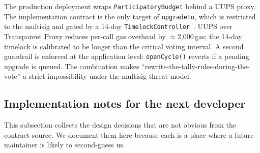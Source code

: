 \documentclass[12pt]{article}
\begin{document}
The production deployment wraps \texttt{ParticipatoryBudget} behind a UUPS
proxy. The implementation contract is the only target of \texttt{upgradeTo},
which is restricted to the multisig and gated by a 14-day
\texttt{TimelockController}~\cite{openzeppelin5}. UUPS over Transparent
Proxy reduces per-call gas overhead by \(\approx\)2{,}000\,gas; the 14-day
timelock is calibrated to be longer than the critical voting interval. A
second guardrail is enforced at the application level: \texttt{openCycle()}
reverts if a pending upgrade is queued. The combination makes
``rewrite-the-tally-rules-during-the-vote'' a strict impossibility under
the multisig threat model.

\subsection{Implementation notes for the next developer}

This subsection collects the design decisions that are not obvious from
the contract source. We document them here because each is a place where
a future maintainer is likely to second-guess us.
\end{document}
